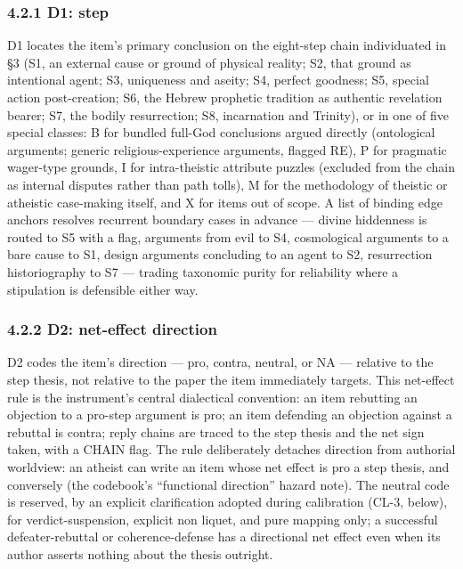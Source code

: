 \subsubsection{4.2.1 D1: step}\label{d1-step}

D1 locates the item's primary conclusion on the eight-step chain individuated in \S{}3 (S1, an external cause or ground of physical reality; S2, that ground as intentional agent; S3, uniqueness and aseity; S4, perfect goodness; S5, special action post-creation; S6, the Hebrew prophetic tradition as authentic revelation bearer; S7, the bodily resurrection; S8, incarnation and Trinity), or in one of five special classes: B for bundled full-God conclusions argued directly (ontological arguments; generic religious-experience arguments, flagged RE), P for pragmatic wager-type grounds, I for intra-theistic attribute puzzles (excluded from the chain as internal disputes rather than path tolls), M for the methodology of theistic or atheistic case-making itself, and X for items out of scope. A list of binding edge anchors resolves recurrent boundary cases in advance --- divine hiddenness is routed to S5 with a flag, arguments from evil to S4, cosmological arguments to a bare cause to S1, design arguments concluding to an agent to S2, resurrection historiography to S7 --- trading taxonomic purity for reliability where a stipulation is defensible either way.

\subsubsection{4.2.2 D2: net-effect direction}\label{d2-net-effect-direction}

D2 codes the item's direction --- pro, contra, neutral, or NA --- relative to the step thesis, not relative to the paper the item immediately targets. This net-effect rule is the instrument's central dialectical convention: an item rebutting an objection to a pro-step argument is pro; an item defending an objection against a rebuttal is contra; reply chains are traced to the step thesis and the net sign taken, with a CHAIN flag. The rule deliberately detaches direction from authorial worldview: an atheist can write an item whose net effect is pro a step thesis, and conversely (the codebook's ``functional direction'' hazard note). The neutral code is reserved, by an explicit clarification adopted during calibration (CL-3, below), for verdict-suspension, explicit non liquet, and pure mapping only; a successful defeater-rebuttal or coherence-defense has a directional net effect even when its author asserts nothing about the thesis outright.

